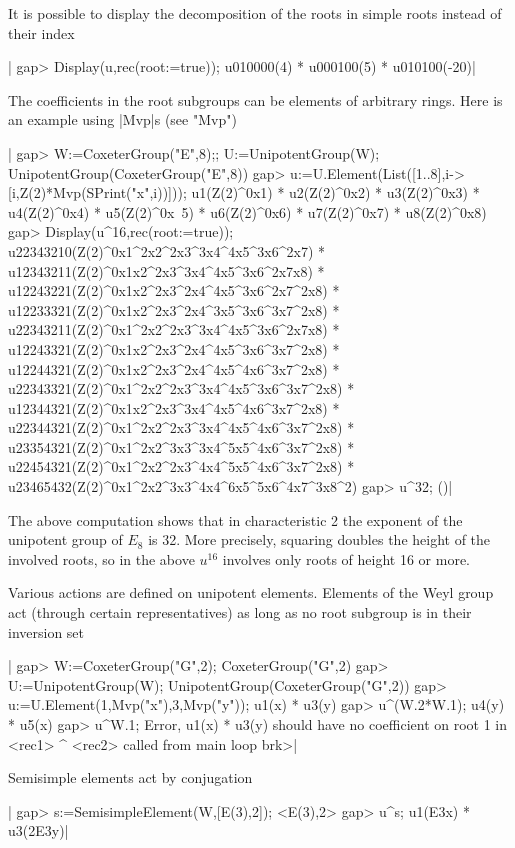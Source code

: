 It is possible to display the decomposition of the roots in simple roots
instead of their index\:

|    gap> Display(u,rec(root:=true));
    u010000(4) * u000100(5) * u010100(-20)|

The coefficients in the root subgroups can be elements of arbitrary rings.
Here is an example using |Mvp|s (see "Mvp")\:

|    gap>  W:=CoxeterGroup("E",8);; U:=UnipotentGroup(W);
    UnipotentGroup(CoxeterGroup("E",8))
    gap> u:=U.Element(List([1..8],i->[i,Z(2)*Mvp(SPrint("x",i))]));
    u1(Z(2)^0x1) * u2(Z(2)^0x2) * u3(Z(2)^0x3) * u4(Z(2)^0x4) * u5(Z(2)^0x\
    5) * u6(Z(2)^0x6) * u7(Z(2)^0x7) * u8(Z(2)^0x8)
    gap> Display(u^16,rec(root:=true));
    u22343210(Z(2)^0x1^2x2^2x3^3x4^4x5^3x6^2x7) *
    u12343211(Z(2)^0x1x2^2x3^3x4^4x5^3x6^2x7x8) *
    u12243221(Z(2)^0x1x2^2x3^2x4^4x5^3x6^2x7^2x8) *
    u12233321(Z(2)^0x1x2^2x3^2x4^3x5^3x6^3x7^2x8) *
    u22343211(Z(2)^0x1^2x2^2x3^3x4^4x5^3x6^2x7x8) *
    u12243321(Z(2)^0x1x2^2x3^2x4^4x5^3x6^3x7^2x8) *
    u12244321(Z(2)^0x1x2^2x3^2x4^4x5^4x6^3x7^2x8) *
    u22343321(Z(2)^0x1^2x2^2x3^3x4^4x5^3x6^3x7^2x8) *
    u12344321(Z(2)^0x1x2^2x3^3x4^4x5^4x6^3x7^2x8) *
    u22344321(Z(2)^0x1^2x2^2x3^3x4^4x5^4x6^3x7^2x8) *
    u23354321(Z(2)^0x1^2x2^3x3^3x4^5x5^4x6^3x7^2x8) *
    u22454321(Z(2)^0x1^2x2^2x3^4x4^5x5^4x6^3x7^2x8) *
    u23465432(Z(2)^0x1^2x2^3x3^4x4^6x5^5x6^4x7^3x8^2)
    gap> u^32;
    ()|

The  above computation shows  that in characteristic  2 the exponent of the
unipotent group of $E_8$ is 32. More precisely, squaring doubles the height
of  the involved  roots, so  in the  above $u^{16}$  involves only roots of
height 16 or more.

Various  actions are  defined on  unipotent elements.  Elements of the Weyl
group  act (through certain representatives) as long as no root subgroup is
in their inversion set\:

|    gap> W:=CoxeterGroup("G",2);
    CoxeterGroup("G",2)
    gap> U:=UnipotentGroup(W);
    UnipotentGroup(CoxeterGroup("G",2))
    gap> u:=U.Element(1,Mvp("x"),3,Mvp("y"));
    u1(x) * u3(y)
    gap> u^(W.2*W.1);
    u4(y) * u5(x)
    gap> u^W.1;
    Error, u1(x) * u3(y) should have no coefficient on root 1
     in
    <rec1> ^ <rec2> called from
    main loop
    brk>|

Semisimple elements act by conjugation\:

|    gap> s:=SemisimpleElement(W,[E(3),2]);
    <E(3),2>
    gap> u^s;
    u1(E3x) * u3(2E3y)|

